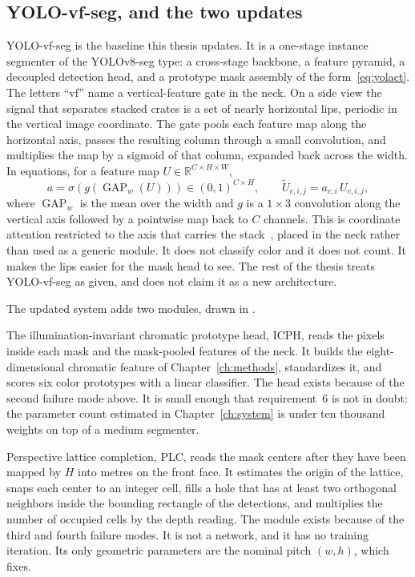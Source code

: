 \subsection{YOLO-vf-seg, and the two updates}
\label{sec:problem-gap}

YOLO-vf-seg is the baseline this thesis updates. It is a one-stage instance segmenter of the YOLOv8-seg type: a cross-stage backbone, a feature pyramid, a decoupled detection head, and a prototype mask assembly of the form~\eqref{eq:yolact}. The letters ``vf'' name a vertical-feature gate in the neck. On a side view the signal that separates stacked crates is a set of nearly horizontal lips, periodic in the vertical image coordinate. The gate pools each feature map along the horizontal axis, passes the resulting column through a small convolution, and multiplies the map by a sigmoid of that column, expanded back across the width. In equations, for a feature map $U\in\mathbb{R}^{C\times H\times W}$,
\begin{equation}
a = \sigma\!\left( g( \operatorname{GAP}_{w}(U) ) \right) \in (0,1)^{C\times H},
\qquad
\tilde{U}_{c,i,j} = a_{c,i}\, U_{c,i,j},
\label{eq:vf}
\end{equation}
where $\operatorname{GAP}_{w}$ is the mean over the width and $g$ is a $1\times 3$ convolution along the vertical axis followed by a pointwise map back to $C$ channels. This is coordinate attention restricted to the axis that carries the stack~\cite{hou2021coordatt}, placed in the neck rather than used as a generic module. It does not classify color and it does not count. It makes the lips easier for the mask head to see. The rest of the thesis treats YOLO-vf-seg as given, and does not claim it as a new architecture.

The updated system adds two modules, drawn in .

The illumination-invariant chromatic prototype head, ICPH, reads the pixels inside each mask and the mask-pooled features of the neck. It builds the eight-dimensional chromatic feature of Chapter~\ref{ch:methods}, standardizes it, and scores six color prototypes with a linear classifier. The head exists because of the second failure mode above. It is small enough that requirement~6 is not in doubt: the parameter count estimated in Chapter~\ref{ch:system} is under ten thousand weights on top of a medium segmenter.

Perspective lattice completion, PLC, reads the mask centers after they have been mapped by $H$ into metres on the front face. It estimates the origin of the lattice, snaps each center to an integer cell, fills a hole that has at least two orthogonal neighbors inside the bounding rectangle of the detections, and multiplies the number of occupied cells by the depth reading. The module exists because of the third and fourth failure modes. It is not a network, and it has no training iteration. Its only geometric parameters are the nominal pitch $(w,h)$, which  fixes.

